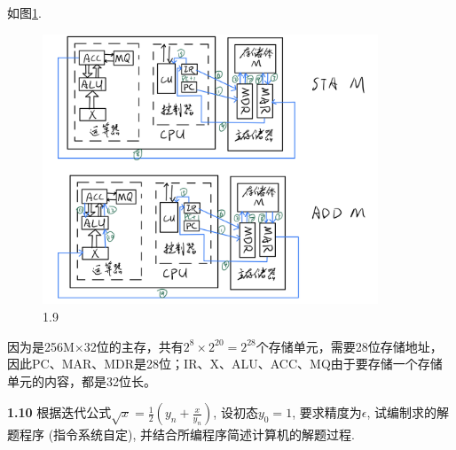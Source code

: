 \documentclass[UTF8]{report}
\newcommand{\problem}[1]{{\setlength{\parskip}{10pt}\noindent \bf{#1}}}
\newenvironment{solution}{{\noindent\hskip 2em \bf 解 \quad}}{}
\begin{document}
\begin{solution}
    如图\ref{fig0109}.

    \begin{figure}[htbp]
        \centering
        \includegraphics[width=10cm]{fig/1.9.png}
        \caption{1.9}
        \label{fig0109}
    \end{figure}

    \newpage

    因为是256M×32位的主存，共有$2^8\times2^{20} = 2^{28}$个存储单元，需要28位存储地址，因此PC、MAR、MDR是28位；IR、X、ALU、ACC、MQ由于要存储一个存储单元的内容，都是32位长。
\end{solution}

\problem{1.10} 根据迭代公式$\displaystyle \sqrt{x} = \frac{1}{2}\left( y_n + \frac{x}{y_n} \right)$, 设初态$y_0=1$, 要求精度为$\epsilon$, 试编制求的解题程序 (指令系统自定), 并结合所编程序简述计算机的解题过程.
\end{document}
